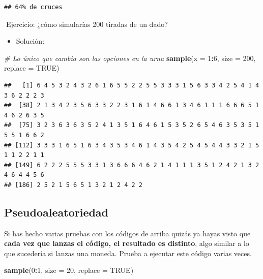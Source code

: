 \documentclass[11pt,]{book}
\newenvironment{Shaded}{\begin{snugshade}}{\end{snugshade}}
\newcommand{\CommentTok}[1]{\textcolor[rgb]{0.37,0.37,0.37}{\textit{#1}}}
\newcommand{\DataTypeTok}[1]{\textcolor[rgb]{0.27,0.27,0.27}{#1}}
\newcommand{\DecValTok}[1]{\textcolor[rgb]{0.06,0.06,0.06}{#1}}
\newcommand{\KeywordTok}[1]{\textcolor[rgb]{0.27,0.27,0.27}{\textbf{#1}}}
\newcommand{\NormalTok}[1]{#1}
\newcommand{\OperatorTok}[1]{\textcolor[rgb]{0.43,0.43,0.43}{\textbf{#1}}}
\newcommand{\OtherTok}[1]{\textcolor[rgb]{0.37,0.37,0.37}{#1}}
\providecommand{\tightlist}{%
  \setlength{\itemsep}{0pt}\setlength{\parskip}{0pt}}
\begin{document}
\begin{verbatim}
## 64% de cruces
\end{verbatim}

📝Ejercicio: ¿cómo simularías 200 tiradas de un dado?

\begin{itemize}
\tightlist
\item
  Solución:
\end{itemize}

\begin{Shaded}
\begin{Highlighting}[]
\CommentTok{# Lo único que cambia son las opciones en la urna}
\KeywordTok{sample}\NormalTok{(}\DataTypeTok{x =} \DecValTok{1}\OperatorTok{:}\DecValTok{6}\NormalTok{, }\DataTypeTok{size =} \DecValTok{200}\NormalTok{, }\DataTypeTok{replace =} \OtherTok{TRUE}\NormalTok{)}
\end{Highlighting}
\end{Shaded}

\begin{verbatim}
##   [1] 6 4 5 3 2 4 3 2 6 1 6 5 5 2 2 5 5 3 3 3 1 5 6 3 3 4 2 5 4 1 4 3 6 2 2 2 3
##  [38] 2 1 3 4 2 3 5 6 3 3 2 2 3 1 6 1 4 6 6 1 3 4 6 1 1 1 6 6 6 5 1 4 6 2 6 3 5
##  [75] 3 2 3 6 3 6 3 5 2 4 1 3 5 1 6 4 6 1 5 3 5 2 6 5 4 6 3 5 3 5 1 5 5 1 6 6 2
## [112] 3 3 3 1 6 5 1 6 3 4 3 5 3 4 6 1 4 3 5 4 2 5 4 5 4 4 3 3 2 1 5 1 1 2 2 1 1
## [149] 6 2 2 2 5 5 5 3 3 1 3 6 6 6 4 6 2 1 4 1 1 1 3 5 1 2 4 2 1 3 2 4 6 4 4 5 6
## [186] 2 5 2 1 5 6 5 1 3 2 1 2 4 2 2
\end{verbatim}

\hypertarget{pseudoaleatorio}{%
\subsection{Pseudoaleatoriedad}\label{pseudoaleatorio}}

Si has hecho varias pruebas con los códigos de arriba quizás ya hayas visto que \textbf{cada vez que lanzas el código, el resultado es distinto}, algo similar a lo que sucedería si lanzas una moneda. Prueba a ejecutar este código varias veces.

\begin{Shaded}
\begin{Highlighting}[]
\KeywordTok{sample}\NormalTok{(}\DecValTok{0}\OperatorTok{:}\DecValTok{1}\NormalTok{, }\DataTypeTok{size =} \DecValTok{20}\NormalTok{, }\DataTypeTok{replace =} \OtherTok{TRUE}\NormalTok{)}
\end{Highlighting}
\end{Shaded}
\end{document}
